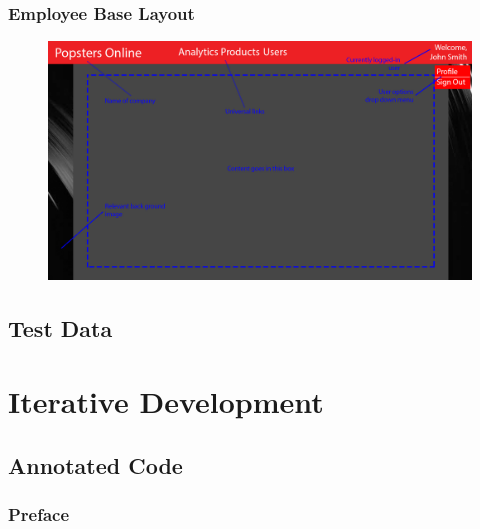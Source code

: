 ﻿\documentclass{article}
\begin{document}
    \paragraph{}

    \newpage
    \subsubsection{Employee Base Layout}
    \begin{figure}[h]
        \includegraphics[width=\textwidth]{employeeBasic.png}
        \centering
    \end{figure}
    \paragraph{}

    \subsection{Test Data}
    
    
    \section{Iterative Development}
    \subsection{Annotated Code}
    \newpage
    \subsubsection{Preface}
\end{document}
